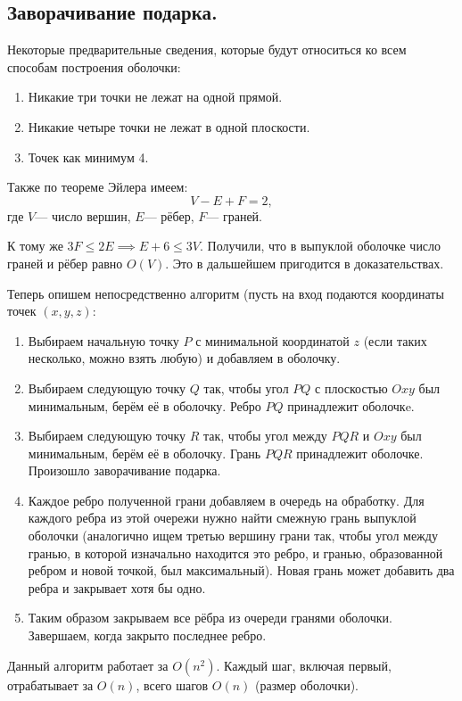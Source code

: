 \subsection{Заворачивание подарка.}
Некоторые предварительные сведения, которые будут относиться ко всем способам построения оболочки:
\begin{enumerate}
  \item Никакие три точки не лежат на одной прямой.
  \item Никакие четыре точки не лежат в одной плоскости.
  \item Точек как минимум 4.
\end{enumerate}

Также по теореме Эйлера имеем:
\[
  V - E + F = 2
,\] где $V$--- число вершин, $E$--- рёбер, $F$--- граней.

К тому же $3F \leq 2E \implies E + 6 \leq 3V$. Получили, что в выпуклой оболочке число граней и
рёбер равно $O(V)$. Это в дальшейшем пригодится в доказательствах.

Теперь опишем непосредственно алгоритм (пусть на вход подаются координаты точек $(x, y, z)$:
\begin{enumerate}
  \item Выбираем начальную точку $P$ с минимальной координатой $z$ (если таких несколько, можно взять любую) и
    добавляем в оболочку.
  \item Выбираем следующую точку $Q$ так, чтобы угол $PQ$ с плоскостью $Oxy$ был минимальным, берём её 
    в оболочку. Ребро $PQ$ принадлежит оболочкe.
  \item Выбираем следующую точку $R$ так, чтобы угол между $PQR$ и $Oxy$ был минимальным, берём её
    в оболочку. Грань $PQR$ принадлежит оболочке. Произошло заворачивание подарка.
  \item Каждое ребро полученной грани добавляем в очередь на обработку. Для каждого ребра из этой
    очережи нужно найти смежную грань выпуклой оболочки (аналогично ищем третью вершину грани так,
    чтобы угол между гранью, в которой изначально находится это ребро, и гранью, образованной
    ребром и новой точкой, был максимальный). Новая грань может добавить два ребра и закрывает
    хотя бы одно.
  \item Таким образом закрываем все рёбра из очереди гранями оболочки. Завершаем, когда закрыто
    последнее ребро.
\end{enumerate}

\begin{remark}
  Данный алгоритм работает за $O(n^2)$. Каждый шаг, включая первый, отрабатывает за $O(n)$, всего шагов
  $O(n)$ (размер оболочки). 
\end{remark}

